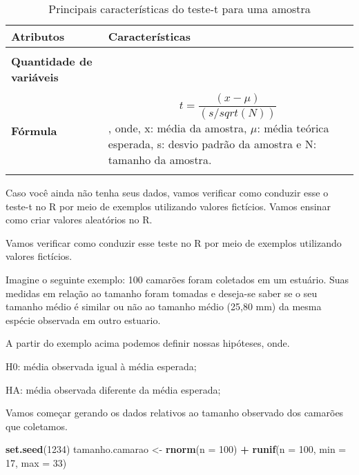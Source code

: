 \documentclass[titlepage, oneside, openany, a4paper]{book}
\newenvironment{Shaded}{\begin{snugshade}}{\end{snugshade}}
\newcommand{\DataTypeTok}[1]{\textcolor[rgb]{0.13,0.29,0.53}{#1}}
\newcommand{\DecValTok}[1]{\textcolor[rgb]{0.00,0.00,0.81}{#1}}
\newcommand{\KeywordTok}[1]{\textcolor[rgb]{0.13,0.29,0.53}{\textbf{#1}}}
\newcommand{\NormalTok}[1]{#1}
\newcommand{\OperatorTok}[1]{\textcolor[rgb]{0.81,0.36,0.00}{\textbf{#1}}}
\newcommand{\StringTok}[1]{\textcolor[rgb]{0.31,0.60,0.02}{#1}}
\begin{document}
\begin{table}

\caption{\label{tab:tab1t}Principais características do teste-t para uma amostra}
\centering
\begin{tabular}[c]{>{\raggedright\arraybackslash}p{10em}>{\raggedright\arraybackslash}p{30em}}
\toprule
Atributos & Características\\
\midrule
\textbf{\cellcolor{gray!6}{Tipo de variável}} & \cellcolor{gray!6}{Quantitativa}\\
\textbf{Quantidade de variáveis} & 1\\
\textbf{\cellcolor{gray!6}{Hipótese nula}} & \cellcolor{gray!6}{A média da variável é similar ao valor previamente estipulado}\\
\textbf{Fórmula} & $$t=\frac{(x-\mu)}{(s/sqrt(N))}$$, onde, x: média da amostra, $\mu$: média teórica esperada, s: desvio padrão da amostra e N: tamanho da amostra.\\
\textbf{\cellcolor{gray!6}{Observação}} & \cellcolor{gray!6}{Não há a necessidade de post-hoc nem expressa-la graficamente}\\
\bottomrule
\end{tabular}
\end{table}

Caso você ainda não tenha seus dados, vamos verificar como conduzir esse o teste-t no R por meio de exemplos utilizando valores fictícios. Vamos ensinar como criar valores aleatórios no R.

Vamos verificar como conduzir esse teste no R por meio de exemplos utilizando valores fictícios.

Imagine o seguinte exemplo: 100 camarões foram coletados em um estuário. Suas medidas em relação ao tamanho foram tomadas e deseja-se saber se o seu tamanho médio é similar ou não ao tamanho médio (25,80 mm) da mesma espécie observada em outro estuario.

A partir do exemplo acima podemos definir nossas hipóteses, onde.

H0: média observada igual à média esperada;

HA: média observada diferente da média esperada;

Vamos começar gerando os dados relativos ao tamanho observado dos camarões que coletamos.

\begin{Shaded}
\begin{Highlighting}[]
\KeywordTok{set.seed}\NormalTok{(}\DecValTok{1234}\NormalTok{)}
\NormalTok{tamanho.camarao <-}\StringTok{ }\KeywordTok{rnorm}\NormalTok{(}\DataTypeTok{n =} \DecValTok{100}\NormalTok{) }\OperatorTok{+}\StringTok{ }\KeywordTok{runif}\NormalTok{(}\DataTypeTok{n =} \DecValTok{100}\NormalTok{, }\DataTypeTok{min =} \DecValTok{17}\NormalTok{, }\DataTypeTok{max =} \DecValTok{33}\NormalTok{)}
\end{Highlighting}
\end{Shaded}
\end{document}

